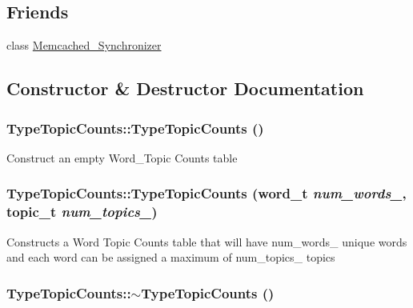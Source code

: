 \subsection*{Friends}
\begin{DoxyCompactItemize}
\item 
class \hyperlink{class_type_topic_counts_a262cd29ee3b1d36569101e365d04b725}{Memcached\_\-Synchronizer}
\end{DoxyCompactItemize}


\subsection{Constructor \& Destructor Documentation}
\hypertarget{class_type_topic_counts_a461c45af231cb3a4c6c116eb9daa5ee5}{
\subsubsection[{TypeTopicCounts}]{\setlength{\rightskip}{0pt plus 5cm}TypeTopicCounts::TypeTopicCounts ()}}
\label{class_type_topic_counts_a461c45af231cb3a4c6c116eb9daa5ee5}
Construct an empty Word\_\-Topic Counts table \hypertarget{class_type_topic_counts_a199efa3085b514a0e155e24d807fe749}{
\subsubsection[{TypeTopicCounts}]{\setlength{\rightskip}{0pt plus 5cm}TypeTopicCounts::TypeTopicCounts (word\_\-t {\em num\_\-words\_\-}, \/  topic\_\-t {\em num\_\-topics\_\-})}}
\label{class_type_topic_counts_a199efa3085b514a0e155e24d807fe749}
Constructs a Word Topic Counts table that will have num\_\-words\_\- unique words and each word can be assigned a maximum of num\_\-topics\_\- topics \hypertarget{class_type_topic_counts_a96bfd72683e9d117836c6118e62f2957}{
\subsubsection[{$\sim$TypeTopicCounts}]{\setlength{\rightskip}{0pt plus 5cm}TypeTopicCounts::$\sim$TypeTopicCounts ()}}
\label{class_type_topic_counts_a96bfd72683e9d117836c6118e62f2957}


